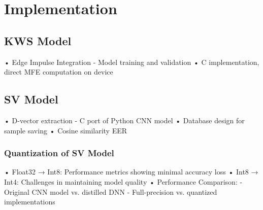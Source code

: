 \chapter{Implementation}
\label{cha:implementation} 
\section{KWS Model}
\label{sec:kws deployment}
• Edge Impulse Integration - Model training and validation\newline
• C implementation, direct MFE computation on device\newline

\section{SV Model}
\label{sec:sv implementation}
• D-vector extraction - C port of Python CNN model \newline
• Database design for sample saving \newline
• Cosine similarity EER \newline

\subsection{Quantization of SV Model}
\label{sec:quantization}
• Float32 → Int8: Performance metrics showing minimal accuracy loss\newline
• Int8 → Int4: Challenges in maintaining model quality\newline
• Performance Comparison:\newline
    - Original CNN model vs. distilled DNN\newline
    - Full-precision vs. quantized implementations\newline


\newpage